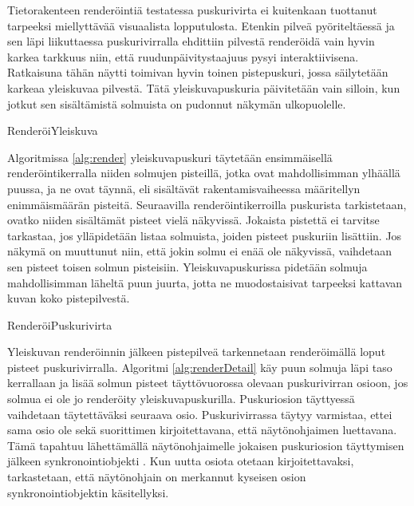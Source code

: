 Tietorakenteen renderöintiä testatessa puskurivirta ei kuitenkaan tuottanut tarpeeksi miellyttävää visuaalista lopputulosta. Etenkin pilveä pyöriteltäessä ja sen läpi liikuttaessa puskurivirralla ehdittiin pilvestä renderöidä vain hyvin karkea tarkkuus niin, että ruudunpäivitystaajuus pysyi interaktiivisena. Ratkaisuna tähän näytti toimivan hyvin toinen pistepuskuri, jossa säilytetään karkeaa yleiskuvaa pilvestä. Tätä yleiskuvapuskuria päivitetään vain silloin, kun jotkut sen sisältämistä solmuista on pudonnut näkymän ulkopuolelle. 

\begin{algorithm}[H]
    \caption{RenderöiYleiskuva}
    \label{alg:render}
    
\end{algorithm}
\vspace*{0.5cm}   

Algoritmissa \ref{alg:render} yleiskuvapuskuri täytetään ensimmäisellä renderöintikerralla niiden solmujen pisteillä, jotka ovat mahdollisimman ylhäällä puussa, ja ne ovat täynnä, eli sisältävät rakentamisvaiheessa määritellyn enimmäismäärän pisteitä. Seuraavilla renderöintikerroilla puskurista tarkistetaan, ovatko niiden sisältämät pisteet vielä näkyvissä. Jokaista pistettä ei tarvitse tarkastaa, jos ylläpidetään listaa solmuista, joiden pisteet puskuriin lisättiin. Jos näkymä on muuttunut niin, että jokin solmu ei enää ole näkyvissä, vaihdetaan sen pisteet toisen solmun pisteisiin. Yleiskuvapuskurissa pidetään solmuja mahdollisimman läheltä puun juurta, jotta ne muodostaisivat tarpeeksi kattavan kuvan koko pistepilvestä.

\begin{algorithm}[H]
    \caption{RenderöiPuskurivirta}
    \label{alg:renderDetail}
    
\end{algorithm}
\vspace*{0.5cm}   

Yleiskuvan renderöinnin jälkeen pistepilveä tarkennetaan renderöimällä loput pisteet puskurivirralla. Algoritmi \ref{alg:renderDetail} käy puun solmuja läpi taso kerrallaan ja lisää solmun pisteet täyttövuorossa olevaan puskurivirran osioon, jos solmua ei ole jo renderöity yleiskuvapuskurilla. Puskuriosion täyttyessä vaihdetaan täytettäväksi seuraava osio. Puskurivirrassa täytyy varmistaa, ettei sama osio ole sekä suorittimen kirjoitettavana, että näytönohjaimen luettavana. Tämä tapahtuu lähettämällä näytönohjaimelle jokaisen puskuriosion täyttymisen jälkeen synkronointiobjekti . Kun uutta osiota otetaan kirjoitettavaksi, tarkastetaan, että näytönohjain on merkannut kyseisen osion synkronointiobjektin käsitellyksi. \cite{sync}


